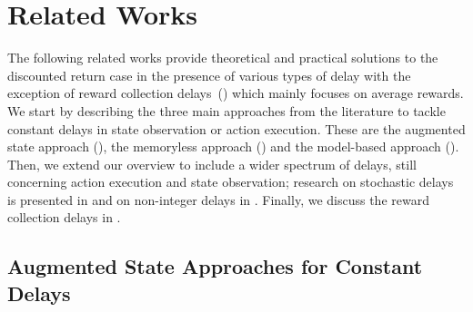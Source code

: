 
\section{Related Works}
\label{sec:related_works}

The following related works provide theoretical and practical solutions to the discounted return case in the presence of various types of delay with the exception of reward collection delays~() which mainly focuses on average rewards. 
We start by describing the three main approaches from the literature to tackle constant delays in state observation or action execution. 
These are the augmented state approach (), the memoryless approach () and the model-based approach ().
Then, we extend our overview to include a wider spectrum of delays, still concerning action execution and state observation; research on stochastic delays is presented in  and on non-integer delays in .
Finally, we discuss the reward collection delays in .



\subsection{Augmented State Approaches for Constant Delays}
\label{subsec:augmented_related}

